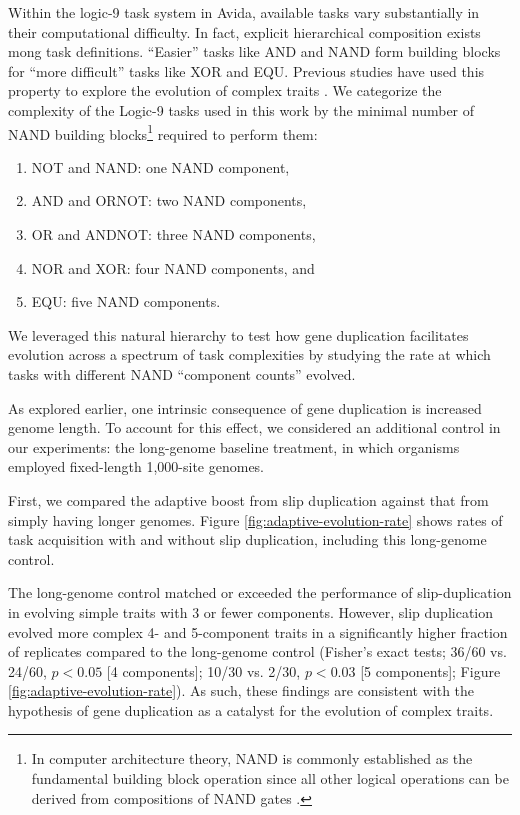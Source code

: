 Within the logic-9 task system in Avida, available tasks vary substantially in their computational difficulty.
In fact, explicit hierarchical composition exists mong task definitions.
``Easier'' tasks like AND and NAND form building blocks for ``more difficult'' tasks like XOR and EQU.
Previous studies have used this property to explore the evolution of complex traits \citep{lenski2003evolution}.
We categorize the complexity of the Logic-9 tasks used in this work by the minimal number of NAND building blocks\footnote{
In computer architecture theory, NAND is commonly established as the fundamental building block operation since all other logical operations can be derived from compositions of NAND gates \citep{TODO}.
} required to perform them:
\begin{enumerate}
\item NOT and NAND: one NAND component,
\item AND and ORNOT: two NAND components,
\item OR and ANDNOT: three NAND components,
\item NOR and XOR: four NAND components, and
\item EQU: five NAND components.
\end{enumerate}
We leveraged this natural hierarchy to test how gene duplication facilitates evolution across a spectrum of task complexities by studying the rate at which tasks with different NAND ``component counts'' evolved.

As explored earlier, one intrinsic consequence of gene duplication is increased genome length.
To account for this effect, we considered an additional control in our experiments: the long-genome baseline treatment, in which organisms employed fixed-length 1,000-site genomes.



First, we compared the adaptive boost from slip duplication against that from simply having longer genomes.
Figure \ref{fig:adaptive-evolution-rate} shows rates of task acquisition with and without slip duplication, including this long-genome control.

The long-genome control matched or exceeded the performance of slip-duplication in evolving simple traits with 3 or fewer components.
However, slip duplication evolved more complex 4- and 5-component traits in a significantly higher fraction of replicates compared to the long-genome control (Fisher's exact tests; 36/60 vs. 24/60, $p<0.05$ [4 components]; 10/30 vs. 2/30, $p<0.03$ [5 components]; Figure \ref{fig:adaptive-evolution-rate}).
As such, these findings are consistent with the hypothesis of gene duplication as a catalyst for the evolution of complex traits.

